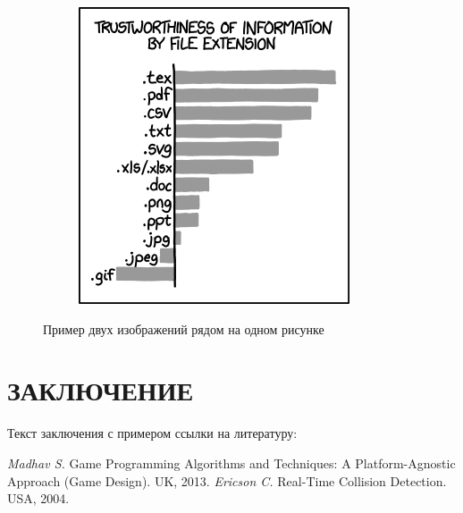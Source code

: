 \documentclass[intlimits,twoside,a4paper,11pt]{article}
\begin{document}
\begin{figure}[H]
\begin{subfigure}[t]{50mm}
            \includegraphics[width=\textwidth]{xkcd1301.png}
            \subcaption{} %
            \label{fig-example-2b}
        \end{subfigure}
        \caption{Пример двух изображений рядом на одном рисунке} \label{fig-example-2}
    \end{figure}

    \section{ЗАКЛЮЧЕНИЕ}
    Текст заключения с примером ссылки на литературу:~\cite{lib-1,lib-2}

    \begin{thebibliography}{9}
         {\it Madhav S.} Game Programming Algorithms and Techniques: A Platform-Agnostic Approach (Game Design). UK, 2013.
         {\it Ericson C.} Real-Time Collision Detection. USA, 2004.
    \end{thebibliography}
\end{document}

